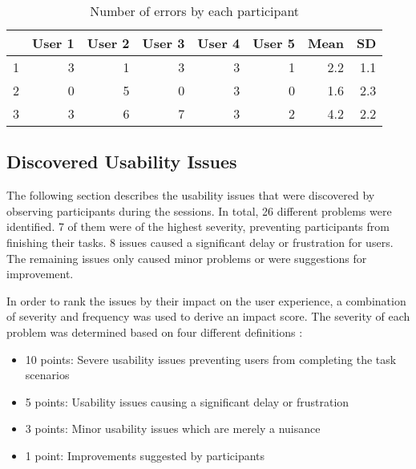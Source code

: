 
\begin{table}[h!]
\begin{tabular}{|r|r|r|r|r|r|r|r|}
\hline
\rowcolor[HTML]{EFEFEF}
\multicolumn{1}{|l|}{\cellcolor[HTML]{EFEFEF}\textbf{Scenario}} & \multicolumn{1}{l|}{\cellcolor[HTML]{EFEFEF}\textbf{User 1}} & \multicolumn{1}{l|}{\cellcolor[HTML]{EFEFEF}\textbf{User 2}} & \multicolumn{1}{l|}{\cellcolor[HTML]{EFEFEF}\textbf{User 3}} & \multicolumn{1}{l|}{\cellcolor[HTML]{EFEFEF}\textbf{User 4}} & \multicolumn{1}{l|}{\cellcolor[HTML]{EFEFEF}\textbf{User 5}} & \multicolumn{1}{l|}{\cellcolor[HTML]{EFEFEF}\textbf{Mean}} & \multicolumn{1}{l|}{\cellcolor[HTML]{EFEFEF}\textbf{SD}} \\ \hline
\cellcolor[HTML]{EFEFEF}1 & 3 & 1 & 3 & 3 & 1 & 2.2 & 1.1 \\ \hline
\cellcolor[HTML]{EFEFEF}2 & 0 & 5 & 0 & 3 & 0 & 1.6 & 2.3 \\ \hline
\cellcolor[HTML]{EFEFEF}3 & 3 & 6 & 7 & 3 & 2 & 4.2 & 2.2 \\ \hline
\end{tabular}
\centering
\caption{Number of errors by each participant}
\label{table:error-rate}
\end{table}

\subsection{Discovered Usability Issues} \label{sec:usability-issues-1st-study}
The following section describes the usability issues that were discovered by observing participants during the sessions. In total, 26 different problems were identified. 7 of them were of the highest severity, preventing participants from finishing their tasks. 8 issues caused a significant delay or frustration for users. The remaining issues only caused minor problems or were suggestions for improvement.

In order to rank the issues by their impact on the user experience, a combination of severity and frequency was used to derive an impact score. The severity of each problem was determined based on four different definitions \cite{sauro_quantifying_2012}:

\begin{itemize}
\item 10 points: Severe usability issues preventing users from completing the task scenarios
\item 5 points: Usability issues causing a significant delay or frustration
\item 3 points: Minor usability issues which are merely a nuisance
\item 1 point: Improvements suggested by participants
\end{itemize}

